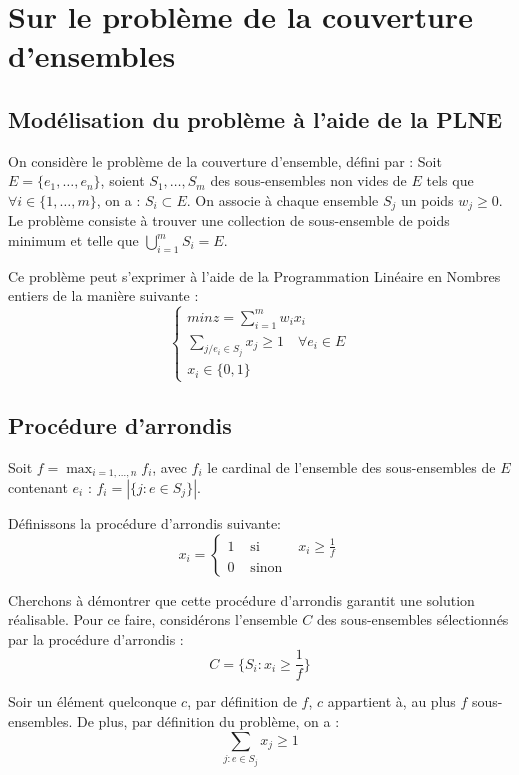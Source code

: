 \section{Sur le problème de la couverture d'ensembles}

\subsection{Modélisation du problème à l'aide de la PLNE}

On considère le problème de la couverture d'ensemble, défini par :
Soit $E = \lbrace e_1, \dots, e_n \rbrace$, soient $S_1, \dots, S_m$ des sous-ensembles non vides
de $E$ tels que $\forall i \in \{1, \dots, m\}$, on a : $S_i \subset E$. On associe à chaque
ensemble $S_j$ un poids $w_j \geq 0$. Le problème consiste à trouver une collection de sous-ensemble
de poids minimum et telle que $\bigcup_{i=1}^m S_i = E$.

Ce problème peut s'exprimer à l'aide de la Programmation Linéaire en Nombres entiers de la manière
suivante : $$
\left \lbrace
\begin{array}{l}
	min z = \sum_{i=1}^m w_ix_i \\
	\sum_{j / e_i \in S_j} x_j \geq 1 \quad \forall e_i \in E \\
	x_i \in \{0, 1\}
\end{array} \right.
$$

\subsection{Procédure d'arrondis}

Soit $f = \max_{i=1,\dots,n} f_i$, avec $f_i$ le cardinal de l'ensemble des sous-ensembles de $E$
contenant $e_i$ : $ f_i = |\{j : e \in S_j\}|$.

Définissons la procédure d'arrondis suivante: $$
x_i = \left \{ \begin{array}{rcl}
		1 & \mbox{ si } & x_i \geq \frac{1}{f} \\
		0 & \mbox{ sinon } &
	\end{array} \right .
	$$

Cherchons à démontrer que cette procédure d'arrondis garantit une solution réalisable. Pour ce
faire, considérons l'ensemble $C$ des sous-ensembles sélectionnés par la procédure d'arrondis : $$ C
= \{ S_i : x_i \geq \frac{1}{f} \} $$

Soir un élément quelconque $c$, par définition de $f$, $c$ appartient à, au plus $f$ sous-ensembles.
De plus, par définition du problème, on a : $$
\sum_{j : e \in S_j} x_j \geq 1 $$

